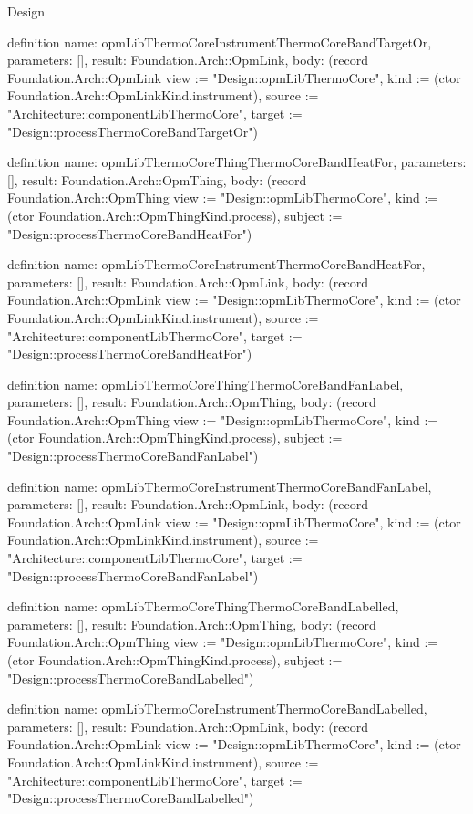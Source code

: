 \begin{lexlean}{Design}
\begin{semanticmodule}
definition{
  name: opmLibThermoCoreInstrumentThermoCoreBandTargetOr,
  parameters: [],
  result: Foundation.Arch::OpmLink,
  body: (record Foundation.Arch::OpmLink {view := "Design::opmLibThermoCore", kind := (ctor Foundation.Arch::OpmLinkKind.instrument), source := "Architecture::componentLibThermoCore", target := "Design::processThermoCoreBandTargetOr"})
}

definition{
  name: opmLibThermoCoreThingThermoCoreBandHeatFor,
  parameters: [],
  result: Foundation.Arch::OpmThing,
  body: (record Foundation.Arch::OpmThing {view := "Design::opmLibThermoCore", kind := (ctor Foundation.Arch::OpmThingKind.process), subject := "Design::processThermoCoreBandHeatFor"})
}

definition{
  name: opmLibThermoCoreInstrumentThermoCoreBandHeatFor,
  parameters: [],
  result: Foundation.Arch::OpmLink,
  body: (record Foundation.Arch::OpmLink {view := "Design::opmLibThermoCore", kind := (ctor Foundation.Arch::OpmLinkKind.instrument), source := "Architecture::componentLibThermoCore", target := "Design::processThermoCoreBandHeatFor"})
}

definition{
  name: opmLibThermoCoreThingThermoCoreBandFanLabel,
  parameters: [],
  result: Foundation.Arch::OpmThing,
  body: (record Foundation.Arch::OpmThing {view := "Design::opmLibThermoCore", kind := (ctor Foundation.Arch::OpmThingKind.process), subject := "Design::processThermoCoreBandFanLabel"})
}

definition{
  name: opmLibThermoCoreInstrumentThermoCoreBandFanLabel,
  parameters: [],
  result: Foundation.Arch::OpmLink,
  body: (record Foundation.Arch::OpmLink {view := "Design::opmLibThermoCore", kind := (ctor Foundation.Arch::OpmLinkKind.instrument), source := "Architecture::componentLibThermoCore", target := "Design::processThermoCoreBandFanLabel"})
}

definition{
  name: opmLibThermoCoreThingThermoCoreBandLabelled,
  parameters: [],
  result: Foundation.Arch::OpmThing,
  body: (record Foundation.Arch::OpmThing {view := "Design::opmLibThermoCore", kind := (ctor Foundation.Arch::OpmThingKind.process), subject := "Design::processThermoCoreBandLabelled"})
}

definition{
  name: opmLibThermoCoreInstrumentThermoCoreBandLabelled,
  parameters: [],
  result: Foundation.Arch::OpmLink,
  body: (record Foundation.Arch::OpmLink {view := "Design::opmLibThermoCore", kind := (ctor Foundation.Arch::OpmLinkKind.instrument), source := "Architecture::componentLibThermoCore", target := "Design::processThermoCoreBandLabelled"})
}


\end{semanticmodule}
\end{lexlean}
